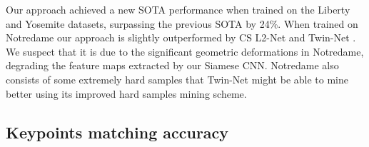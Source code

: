 \documentclass[10pt,journal]{IEEEtran}\usepackage{amsfonts}
\begin{document}
Our approach achieved a new SOTA performance when trained on the Liberty and
Yosemite datasets, surpassing the previous SOTA by 24\%. When trained on
Notredame our approach is slightly outperformed by CS L2-Net \cite{L2Net}
and Twin-Net \cite{Twin_net}. We suspect that it is due to the significant
geometric deformations in Notredame, degrading the feature maps extracted by
our Siamese CNN. Notredame also consists of some extremely hard samples that
Twin-Net \cite{Twin_net} might be able to mine better using its improved
hard samples mining scheme.

\subsection{Keypoints matching accuracy}

\label{subsec:matching accuracy}
\end{document}

